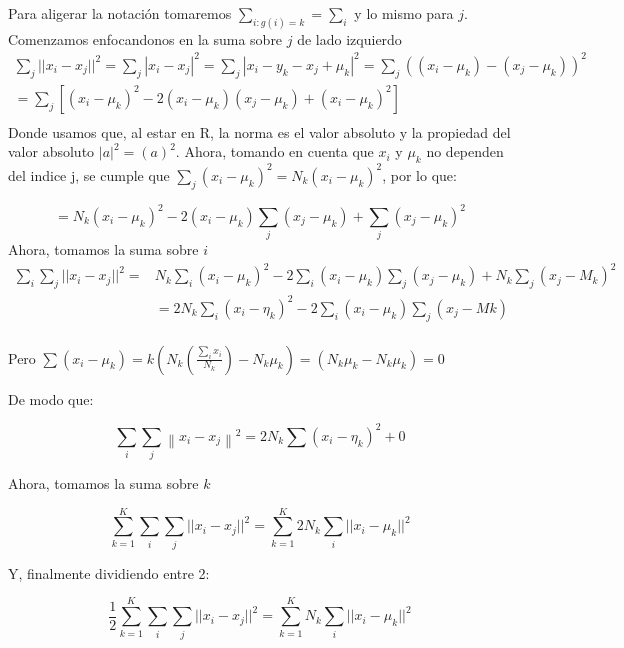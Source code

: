 \documentclass[letter, 11pt, twoside]{report}
\begin{document}
Para aligerar la notación tomaremos $\sum_{i: g(i)=k}=\sum_{i}$ y lo mismo para $j$. Comenzamos enfocandonos en la suma sobre $j$ de lado izquierdo
$$
\begin{gathered}
    \sum_{j}   ||x_i - x_j||^2 =  \sum_{j}|x_i - x_j|^2=\sum_j\left|x_i-y_k-x_j+\mu_k\right|^2=\sum_j\left(\left(x_i-\mu_k\right)-\left(x_j-\mu_k\right)\right)^2 \\
=\sum_j\left[\left(x_i-\mu_k\right)^2-2\left(x_i-\mu_k\right)\left(x_j-\mu_k\right)+\left(x_i-\mu_k\right)^2\right] \\
\end{gathered}
$$
Donde usamos que, al estar en R, la norma es el valor absoluto y la propiedad del valor absoluto $|a|^2=(a)^2$.
Ahora, tomando en cuenta que $x_i$ y $\mu_k$ no dependen del indice j, se cumple que $\sum_j\left(x_i-\mu_k\right)^2=N_k\left(x_i-\mu_k\right)^2$,
por lo que:

$$=N_k\left(x_i-\mu_k\right)^2-2\left(x_i-\mu_k\right) \sum_j\left(x_j-\mu_k\right)+\sum_j\left(x_j-\mu_k\right)^2$$
Ahora, tomamos la suma sobre $i$
$$
\begin{aligned}
    \sum_{i}  \sum_{j}   ||x_i - x_j||^2 =& N_k \sum_i\left(x_i-\mu_k\right)^2-2 \sum_i\left(x_i-\mu_k\right) \sum_j\left(x_j-\mu_k\right)+N_k \sum_j\left(x_j-M_k\right)^2 \\
& =2 N_k \sum_i\left(x_i-\eta_k\right)^2-2 \sum_i\left(x_i-\mu_k\right) \sum_j\left(x_j-M k\right) \\
\end{aligned}
$$

Pero $\sum\left(x_i-\mu_k\right)=k\left(N_k\left(\frac{\sum_i x_i}{N_k}\right)-N_k \mu_k\right)=\left(N_k \mu_k-N_k \mu_k\right)=0$

De modo que:

$$  \sum_i \sum_j\left\|x_i-x_j\right\|^2=2N_k \sum\left(x_i-\eta_k\right)^2+0$$

Ahora, tomamos la suma sobre $k$


\begin{equation*}
    \sum_{k=1}^K  \sum_{i}  \sum_{j}   ||x_i - x_j||^2  = 
    \sum_{k=1}^K 2N_k  \sum_{i}   ||x_i - \mu_k||^2 
   \end{equation*}
   
Y, finalmente dividiendo entre 2:

\begin{equation*}
    \frac{1}{2}\sum_{k=1}^K  \sum_{i}  \sum_{j}   ||x_i - x_j||^2  = 
    \sum_{k=1}^K N_k  \sum_{i}   ||x_i - \mu_k||^2 
   \end{equation*}
\end{document}
